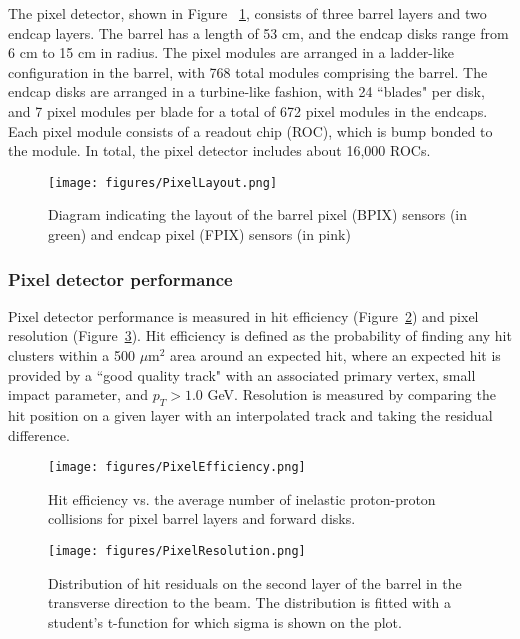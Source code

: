 The pixel detector, shown in Figure ~\ref{fig:PixelLayout}, consists of three barrel layers and two endcap layers. The barrel has a length of 53 cm, and the endcap disks range from 6 cm to 15 cm in radius. The pixel modules are arranged in a ladder-like configuration in the barrel, with 768 total modules comprising the barrel. The endcap disks are arranged in a turbine-like fashion, with 24 ``blades" per disk, and 7 pixel modules per blade for a total of 672 pixel modules in the endcaps.
Each pixel module consists of a readout chip (ROC), which is bump bonded to the module. In total, the pixel detector includes about 16,000 ROCs.

\begin{figure}\centering
  \texttt{[image: figures/PixelLayout.png]}
  \caption{\label{fig:PixelLayout} Diagram indicating the layout of the barrel pixel (BPIX) sensors (in green) and endcap pixel (FPIX) sensors (in pink)}
\end{figure}

\subsubsection{Pixel detector performance}

Pixel detector performance is measured in hit efficiency (Figure~\ref{fig:PixelEfficiency}) and pixel resolution (Figure~\ref{fig:PixelResolution}). Hit efficiency is defined as the probability of finding any hit clusters within a 500 $\mu$m$^2$ area around an expected hit, where an expected hit is provided by a ``good quality track" with an associated primary vertex, small impact parameter, and $p_{T} > 1.0$ GeV. Resolution is measured by comparing the hit position on a given layer with an interpolated track and taking the residual difference. %

\begin{figure}\centering
  \texttt{[image: figures/PixelEfficiency.png]}
  \caption{\label{fig:PixelEfficiency} Hit efficiency vs. the average number of inelastic proton-proton collisions for pixel barrel layers and forward disks.}
\end{figure}

\begin{figure}\centering
  \texttt{[image: figures/PixelResolution.png]}
  \caption{\label{fig:PixelResolution} Distribution of hit residuals on the second layer of the barrel in the transverse direction to the beam. The distribution is fitted with a student's t-function for which sigma is shown on the plot.}
\end{figure}

